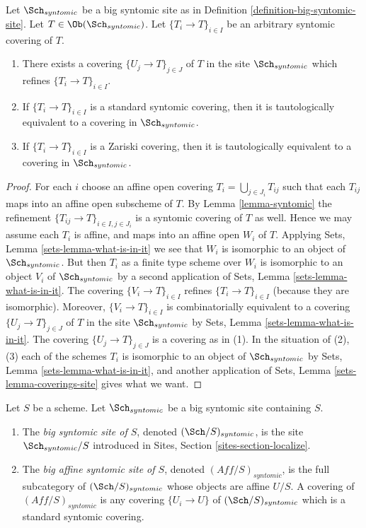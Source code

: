 \begin{lemma}
\label{lemma-syntomic-induced}
Let $\Sch_{syntomic}$ be a big syntomic site as in
Definition \ref{definition-big-syntomic-site}.
Let $T \in \Ob(\Sch_{syntomic})$.
Let $\{T_i \to T\}_{i \in I}$ be an arbitrary syntomic covering of $T$.
\begin{enumerate}
\item There exists a covering $\{U_j \to T\}_{j \in J}$ of $T$ in the site
$\Sch_{syntomic}$ which refines $\{T_i \to T\}_{i \in I}$.
\item If $\{T_i \to T\}_{i \in I}$ is a standard syntomic covering, then
it is tautologically equivalent to a covering in $\Sch_{syntomic}$.
\item If $\{T_i \to T\}_{i \in I}$ is a Zariski covering, then
it is tautologically equivalent to a covering in $\Sch_{syntomic}$.
\end{enumerate}
\end{lemma}

\begin{proof}
For each $i$ choose an affine open covering $T_i = \bigcup_{j \in J_i} T_{ij}$
such that each $T_{ij}$ maps into an affine open subscheme of $T$. By
Lemma \ref{lemma-syntomic}
the refinement $\{T_{ij} \to T\}_{i \in I, j \in J_i}$ is a syntomic covering
of $T$ as well. Hence we may assume each $T_i$ is affine, and maps into
an affine open $W_i$ of $T$. Applying
Sets, Lemma \ref{sets-lemma-what-is-in-it}
we see that $W_i$ is isomorphic to an object of $\Sch_{syntomic}$.
But then $T_i$ as a finite type scheme over $W_i$
is isomorphic to an object $V_i$ of $\Sch_{syntomic}$ by a second
application of
Sets, Lemma \ref{sets-lemma-what-is-in-it}.
The covering $\{V_i \to T\}_{i \in I}$ refines $\{T_i \to T\}_{i \in I}$
(because they are isomorphic).
Moreover, $\{V_i \to T\}_{i \in I}$ is combinatorially equivalent to a
covering $\{U_j \to T\}_{j \in J}$ of $T$ in the site
$\Sch_{syntomic}$ by
Sets, Lemma \ref{sets-lemma-what-is-in-it}.
The covering $\{U_j \to T\}_{j \in J}$ is a covering as in (1).
In the situation of (2), (3) each of the
schemes $T_i$ is isomorphic to an object of $\Sch_{syntomic}$ by
Sets, Lemma \ref{sets-lemma-what-is-in-it},
and another application of
Sets, Lemma \ref{sets-lemma-coverings-site}
gives what we want.
\end{proof}

\begin{definition}
\label{definition-big-small-syntomic}
Let $S$ be a scheme. Let $\Sch_{syntomic}$ be a big syntomic
site containing $S$.
\begin{enumerate}
\item The {\it big syntomic site of $S$}, denoted
$(\Sch/S)_{syntomic}$, is the site $\Sch_{syntomic}/S$
introduced in Sites, Section \ref{sites-section-localize}.
\item The {\it big affine syntomic site of $S$}, denoted
$(\textit{Aff}/S)_{syntomic}$, is the full subcategory of
$(\Sch/S)_{syntomic}$ whose objects are affine $U/S$.
A covering of $(\textit{Aff}/S)_{syntomic}$ is any covering
$\{U_i \to U\}$ of $(\Sch/S)_{syntomic}$ which is a
standard syntomic covering.
\end{enumerate}
\end{definition}

